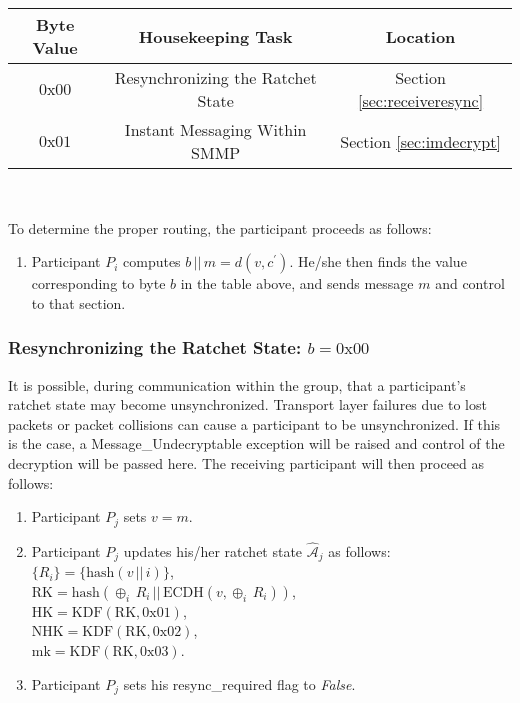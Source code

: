 \documentclass[%
preprint,
amsmath,amssymb,
aps,
prb,
floatfix,
]{revtex4-1}
\begin{document}
\begin{centering}
\begin{tabular}{|c|c|c|}
\hline
Byte Value & Housekeeping Task & Location \\
\hline
$0\mathrm{x}00$ & Resynchronizing the Ratchet State  & Section \ref{sec:receiveresync}\\
$0\mathrm{x}01$ & Instant Messaging Within SMMP & Section \ref{sec:imdecrypt}\\
\hline
\end{tabular} \\
\end{centering}
\bigskip
To determine the proper routing, the
participant proceeds as follows:
\begin{enumerate}
\item Participant $P_i$ computes $b \, || \, m = d(v, c^\prime)$. He/she then
finds the value corresponding to byte $b$ in the table above, and sends message
$m$ and control to that section.
\end{enumerate}
\subsubsection{\label{sec:receiveresync}Resynchronizing the Ratchet State: $b =
0\mathrm{x}00$}
It is possible, during communication within the group, that a participant's
ratchet state may become unsynchronized. Transport layer failures due to lost
packets or packet collisions can cause a participant to be unsynchronized. If
this is the case, a Message\_Undecryptable exception will be raised
and control of the decryption will be passed here. The receiving participant
will then proceed as follows:
\begin{enumerate}
\item Participant $P_j$ sets $v = m$.
\item Participant $P_j$ updates his/her ratchet state
$\mathcal{\hat{A}}_j$ as follows:\\
$\{R_i\} = \{ \mathrm{hash}(v \, || \, i)\}$, \\
$\mathrm{RK} = \mathrm{hash}(\oplus_i \, R_i \, || \, \mathrm{ECDH}(v, \oplus_i
\, R_i))$, \\
$\mathrm{HK} = \mathrm{KDF}(\mathrm{RK}, 0\mathrm{x}01)$, \\
$\mathrm{NHK} = \mathrm{KDF}(\mathrm{RK}, 0\mathrm{x}02)$, \\
$\mathrm{mk} = \mathrm{KDF}(\mathrm{RK}, 0\mathrm{x}03)$.
\item Participant $P_j$ sets his resync\_required flag to \textit{False}.
\end{enumerate}
\end{document}
